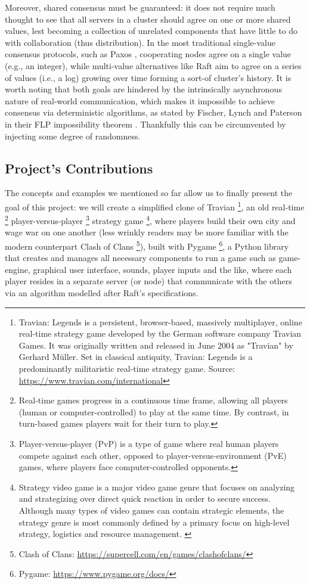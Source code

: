 Moreover, shared consensus must be guaranteed: it does not require much thought to see that all servers in a cluster should agree on one or more shared values, lest becoming a collection of unrelated components that have little to do with collaboration (thus distribution). In the most traditional single-value consensus protocols, such as Paxos \cite{paxos}, cooperating nodes agree on a single value (e.g., an integer), while multi-value alternatives like Raft \cite{raft} aim to agree on a series of values (i.e., a log) growing over time forming a sort-of cluster's history. It is worth noting that both goals are hindered by the intrinsically asynchronous nature of real-world communication, which makes it impossible to achieve consensus via deterministic algorithms, as stated by Fischer, Lynch and Paterson in their FLP impossibility theorem \cite{flp}. Thankfully this can be circumvented by injecting some degree of randomness.

\subsection{Project's Contributions}

The concepts and examples we mentioned so far allow us to finally present the goal of this project: we will create a simplified clone of Travian \footnote{Travian: Legends is a persistent, browser-based, massively multiplayer, online real-time strategy game developed by the German software company Travian Games. It was originally written and released in June 2004 as "Travian" by Gerhard Müller. Set in classical antiquity, Travian: Legends is a predominantly militaristic real-time strategy game. Source: \url{https://www.travian.com/international}}, an old real-time \footnote{Real-time games progress in a continuous time frame, allowing all players (human or computer-controlled) to play at the same time. By contrast, in turn-based games players wait for their turn to play.} player-versus-player \footnote{Player-versus-player (PvP) is a type of game where real human players compete against each other, opposed to player-versus-environment (PvE) games, where players face computer-controlled opponents.} strategy game \footnote{Strategy video game is a major video game genre that focuses on analyzing and strategizing over direct quick reaction in order to secure success. Although many types of video games can contain strategic elements, the strategy genre is most commonly defined by a primary focus on high-level strategy, logistics and resource management. \cite{rollings2003andrew}}, where players build their own city and wage war on one another (less wrinkly readers may be more familiar with the modern counterpart Clash of Clans \footnote{Clash of Clans: \url{https://supercell.com/en/games/clashofclans/}}), built with Pygame \footnote{Pygame: \url{https://www.pygame.org/docs/}}, a Python library that creates and manages all necessary components to run a game such as game-engine, graphical user interface, sounds, player inputs and the like, where each player resides in a separate server (or node) that communicate with the others via an algorithm modelled after Raft's specifications. 

